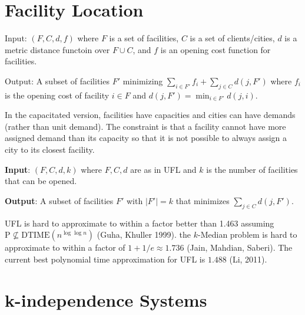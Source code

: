 



\section{Facility Location}

\begin{problem}
    \hfill 

    \normalfont Input: $(F,C,d,f)$ where $F$ is a set of facilities, $C$ is a set of clients/cities, $d$ is a metric distance functoin over $F \cup C$, and $f$ is an opening cost function for facilities.

    \normalfont Output: A subset of facilities $F'$ minimizing $\sum_{i \in F'} f_i + \sum_{j \in C} d(j,F')$ where $f_i$ is the opening cost of facility $i \in F$ and $d(j,F') = \min_{i \in F'}d(j,i)$. 
\end{problem}

In the capacitated version, facilities have capacities and cities can have demands (rather than unit demand). The constraint is that a facility cannot have more assigned demand than its capacity so that it is not possible to always assign a city to its closest facility.

\begin{problem}
    \hfill

    \normalfont \textbf{Input}: $(F,C,d,k)$ where $F,C,d$ are as in UFL and $k$ is the number of facilities that can be opened.

    \normalfont \textbf{Output}: A subset of facilities $F'$ with $|F'| = k$ that minimizes $\sum_{j \in C} d(j,F')$.
\end{problem}

UFL is hard to approximate to within a factor better than 1.463 assuming $\mathrm{P} \nsubseteq \mathrm{DTIME}(n^{\log\log n})$ (Guha, Khuller 1999). the $k$-Median problem is hard to approximate to within a factor of $1 + 1/e \approx 1.736$ (Jain, Mahdian, Saberi). The current best polynomial time approximation for UFL is $1.488$ (Li, 2011).

\section{k-independence Systems}

